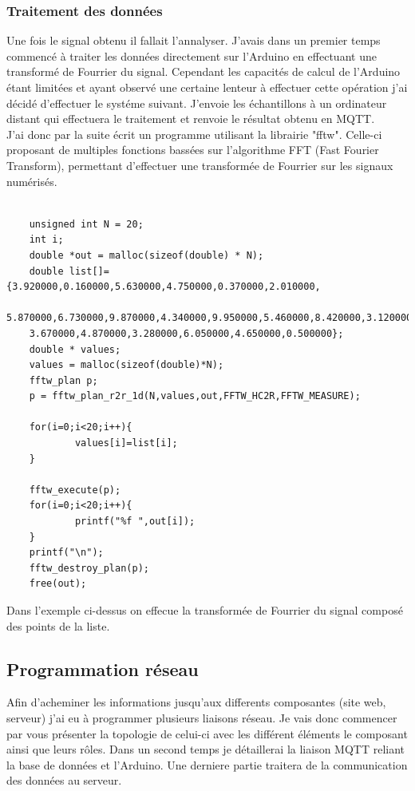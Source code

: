 \documentclass[11pt,french,a4paper]{article}
\begin{document}
\subsubsection{Traitement des données}
Une fois le signal obtenu il fallait l'annalyser. J'avais dans un premier temps commencé à traiter les données directement sur l'Arduino en effectuant une transformé de Fourrier du signal. Cependant les capacités de calcul de l'Arduino étant limitées et ayant observé une certaine lenteur à effectuer cette opération j'ai décidé d'effectuer le systéme suivant. J'envoie les échantillons à un ordinateur distant qui effectuera le traitement et renvoie le résultat obtenu en MQTT.\\
J'ai donc par la suite écrit un programme utilisant la librairie "fftw". Celle-ci proposant de multiples fonctions bassées sur l'algorithme FFT (Fast Fourier Transform), permettant d'effectuer une transformée de Fourrier sur les signaux numérisés.

\begin{scriptsize}
\begin{lstlisting}

	unsigned int N = 20;
	int i;
	double *out = malloc(sizeof(double) * N);
	double list[]={3.920000,0.160000,5.630000,4.750000,0.370000,2.010000,
	5.870000,6.730000,9.870000,4.340000,9.950000,5.460000,8.420000,3.120000,
	3.670000,4.870000,3.280000,6.050000,4.650000,0.500000};
	double * values;
	values = malloc(sizeof(double)*N);
	fftw_plan p;
	p = fftw_plan_r2r_1d(N,values,out,FFTW_HC2R,FFTW_MEASURE);
	
	for(i=0;i<20;i++){
			values[i]=list[i];
	}
	
	fftw_execute(p);
	for(i=0;i<20;i++){
			printf("%f ",out[i]);
	}
	printf("\n");
	fftw_destroy_plan(p);
	free(out);
\end{lstlisting}
\end{scriptsize}


Dans l'exemple ci-dessus on effecue la transformée de Fourrier du signal composé des points de la liste.
\subsection{Programmation réseau}
Afin d'acheminer les informations jusqu'aux differents composantes (site web, serveur) j'ai eu à programmer plusieurs liaisons réseau. Je vais donc commencer par vous présenter la topologie de celui-ci avec les différent éléments le composant ainsi que leurs rôles. Dans un second temps je détaillerai la liaison MQTT reliant la base de données et l'Arduino. Une derniere partie traitera de la communication des données au serveur.
\end{document}
